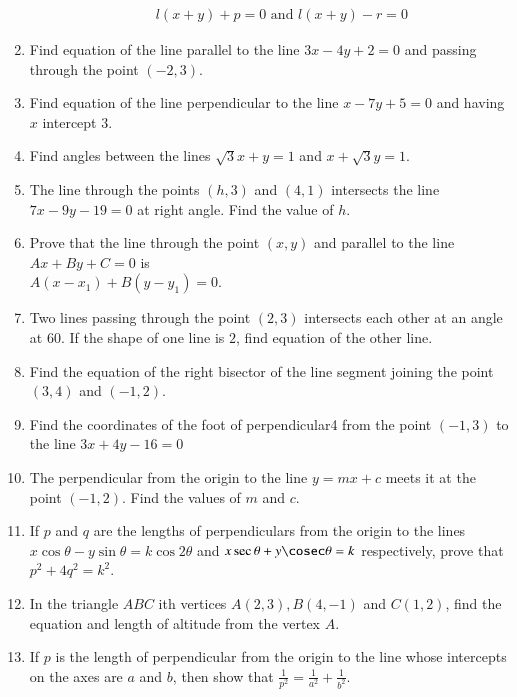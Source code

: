 \documentclass{article}
\theoremstyle{remark}
\begin{document}
\begin{enumerate}
\begin{enumerate}[label=(\roman*)]
\begin{align}
        l(x+y)+p=0 \text{ and } l(x+y)-r=0
              \end{align}
\end{enumerate}
\item Find equation of the line parallel to the line $3x-4y+2=0$ and passing through the point $(-2,3)$.
\item Find equation of the line perpendicular to the line $x-7y+5=0$ and having $x$ intercept $3$.
\item Find angles between the lines $\sqrt3x+y=1$ and $x+\sqrt3y=1$.
\item The line through the points $(h,3)$ and $(4,1)$ intersects the line $7x-9y-19=0$ at right angle. Find the value of $h$.
\item Prove that the line through the point $(x,y)$ and parallel to the line $Ax+By+C=0$ is
\\ $A(x-x_1)+B(y-y_1)=0$.
\item Two lines passing through the point $(2,3)$ intersects each other at an angle at 60\degree. If the shape of one line is $2$, find equation of the other line.
\item Find the equation of the right bisector of the line segment joining the point $(3,4)$ and $(-1,2)$.
\item Find the coordinates of the foot of perpendicular4 from the point $(-1,3)$ to the line $3x+4y-16=0$
\item The perpendicular from the origin to the line $y=mx+c$ meets it at the point $(-1,2)$. Find the values of $m$ and $c$.
\item If $p$ and $q$ are the lengths of perpendiculars from the origin to the lines $x \cos \theta-y \sin \theta=k \cos 2 \theta$ and $x \sec \theta+y \cosec \theta=k$ respectively, prove that $p^2+4q^2=k^2$.
\item In the triangle $ABC$ ith vertices $A(2,3), B(4,-1)$ and $C(1,2)$, find the equation and length of altitude from the vertex $A$.
\item If $p$ is the length of perpendicular from the origin to the line whose intercepts on the axes are $a$  and $b$, then show that $\frac{1}{p^2}=\frac{1}{a^2}+\frac{1}{b^2}$.
\end{enumerate}
\end{document}

